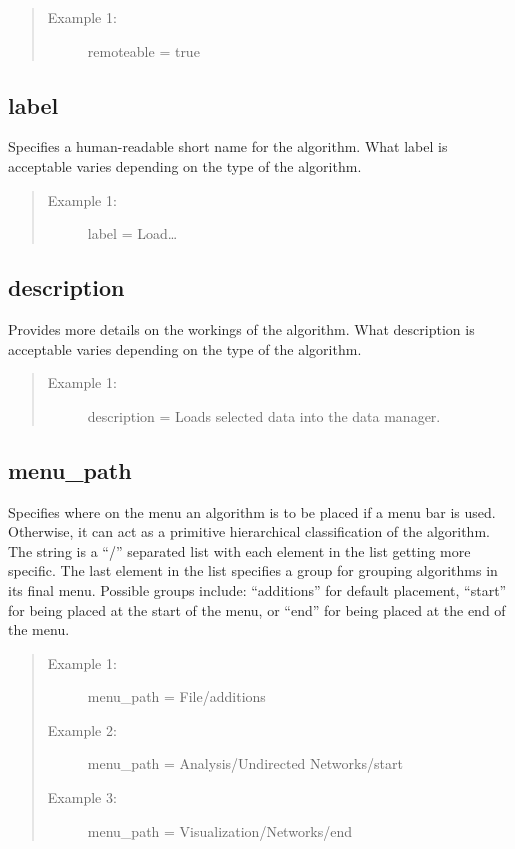 \begin{quote}
\begin{description}
  \item[Example 1:] remoteable = true 
\end{description}
\end{quote}


\subsection*{label}
Specifies a human-readable short name for the algorithm. What label is
acceptable varies depending on the type of the algorithm. 

\begin{quote}
\begin{description}
  \item[Example 1:] label = Load\ldots 
\end{description}
\end{quote}


\subsection*{description}
Provides more details on the workings of the algorithm. What
description is acceptable varies depending on the type of the algorithm.

\begin{quote}
\begin{description}
  \item[Example 1:] description = Loads selected data into the data manager. 
\end{description}
\end{quote}


\subsection*{menu\_path}
Specifies where on the menu an algorithm is to be
placed if a menu bar is used. Otherwise, it can act as a primitive hierarchical
classification of the algorithm. The string is a ``/'' separated list with
each element in the list getting more specific. The last element in the list
specifies a group for grouping algorithms in its final menu. Possible groups
include: ``additions'' for default placement, ``start'' for being placed at
the start of the menu, or ``end'' for being placed at the end of the menu.

\begin{quote}
\begin{description}
  \item[Example 1:] menu\_path = File/additions
  \item[Example 2:] menu\_path = Analysis/Undirected Networks/start
  \item[Example 3:] menu\_path = Visualization/Networks/end
\end{description}
\end{quote}



